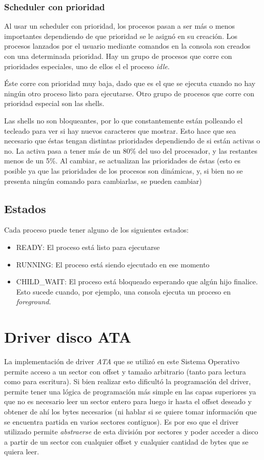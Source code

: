 \documentclass[english]{article}
\begin{document}
\subsubsection{Scheduler con prioridad}
Al usar un scheduler con prioridad, los procesos pasan a ser más o menos importantes dependiendo de que prioridad se le asignó en su creación. Los procesos lanzados por el usuario mediante comandos en la consola son creados con una determinada prioridad. Hay un grupo de procesos que corre con prioridades especiales, uno de ellos el el proceso \emph{idle}.

Éste corre con prioridad muy baja, dado que es el que se ejecuta cuando no hay ningún otro proceso listo para ejecutarse. Otro grupo de procesos que corre con prioridad especial son las shells.

Las shells no son bloqueantes, por lo que constantemente están polleando el tecleado para ver si hay nuevos caracteres que mostrar. Esto hace que sea necesario que éstas tengan distintas prioridades dependiendo de si están activas o no. La activa pasa a tener más de un 80\% del uso del procesador, y las restantes menos de un 5\%. Al cambiar, se actualizan las prioridades de éstas (esto es posible ya que las prioridades de los procesos son dinámicas, y, si bien no se presenta ningún comando para cambiarlas, se pueden cambiar)

\subsection{Estados}
Cada proceso puede tener alguno de los siguientes estados:
\begin{itemize}
\item READY: El proceso está listo para ejecutarse
\item RUNNING: El proceso está siendo ejecutado en ese momento
\item CHILD\_WAIT: El proceso está bloqueado esperando que algún hijo finalice. Esto sucede cuando, por ejemplo, una consola ejecuta un proceso en \emph{foreground}.
\end{itemize}

\pagebreak{}

\section{Driver disco ATA}

La implementación de driver \emph{ATA} que se utilizó en este Sistema Operativo permite
acceso a un sector con offset y tamaño arbitrario (tanto para lectura
como para escritura). Si bien realizar esto dificultó la programación
del driver, permite tener una lógica de programación más simple en
las capas superiores ya que no es necesario leer un sector entero
para luego ir hasta el offset deseado y obtener de ahí los bytes
necesarios (ni hablar si se quiere tomar información que se encuentra
partida en varios sectores contiguos). Es por eso que el driver utilizado
permite \emph{abstraerse} de esta división por sectores y poder acceder
a disco a partir de un sector con cualquier offset y cualquier cantidad
de bytes que se quiera leer.
\end{document}
